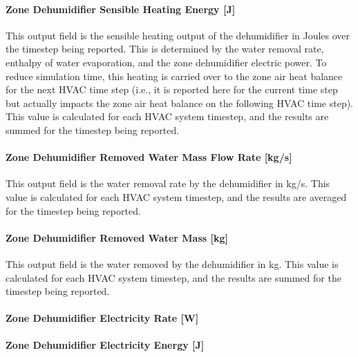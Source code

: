 \paragraph{Zone Dehumidifier Sensible Heating Energy {[}J{]}}\label{zone-dehumidifier-sensible-heating-energy-j}

This output field is the sensible heating output of the dehumidifier in Joules over the timestep being reported. This is determined by the water removal rate, enthalpy of water evaporation, and the zone dehumidifier electric power. To reduce simulation time, this heating is carried over to the zone air heat balance for the next HVAC time step (i.e., it is reported here for the current time step but actually impacts the zone air heat balance on the following HVAC time step). This value is calculated for each HVAC system timestep, and the results are summed for the timestep being reported.

\paragraph{Zone Dehumidifier Removed Water Mass Flow Rate {[}kg/s{]}}\label{zone-dehumidifier-removed-water-mass-flow-rate-kgs}

This output field is the water removal rate by the dehumidifier in kg/s. This value is calculated for each HVAC system timestep, and the results are averaged for the timestep being reported.

\paragraph{Zone Dehumidifier Removed Water Mass {[}kg{]}}\label{zone-dehumidifier-removed-water-mass-kg}

This output field is the water removed by the dehumidifier in kg. This value is calculated for each HVAC system timestep, and the results are summed for the timestep being reported.

\paragraph{Zone Dehumidifier Electricity Rate {[}W{]}}\label{zone-dehumidifier-electric-power-w}

\paragraph{Zone Dehumidifier Electricity Energy {[}J{]}}\label{zone-dehumidifier-electric-energy-j}

